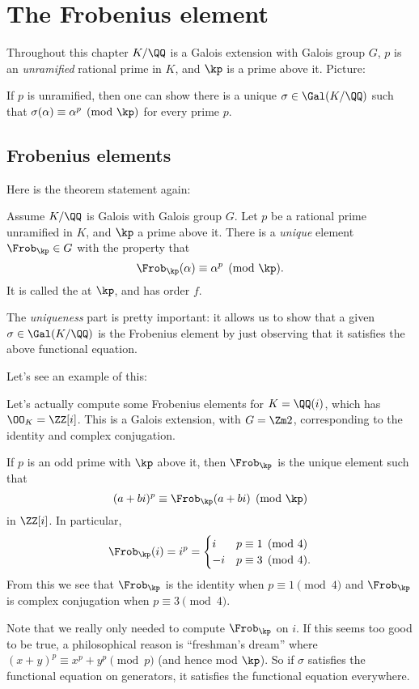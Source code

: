 \chapter{The Frobenius element}
Throughout this chapter $K/\QQ$ is a Galois extension with Galois group $G$,
$p$ is an \emph{unramified} rational prime in $K$, and $\kp$ is a prime above it.
Picture:
\begin{center}
\end{center}
If $p$ is unramified, then one can show there
is a unique $\sigma \in \Gal(K/\QQ)$ such that
$\sigma(\alpha) \equiv \alpha^p \pmod{\kp}$ for every prime $p$.

\section{Frobenius elements}

Here is the theorem statement again:
\begin{theorem}
	Assume $K/\QQ$ is Galois with Galois group $G$.
	Let $p$ be a rational prime unramified in $K$, and $\kp$ a prime above it.
	There is a \emph{unique} element $\Frob_\kp \in G$
	with the property that
	\[ \Frob_\kp(\alpha) \equiv \alpha^{p} \pmod{\kp}. \]
	It is called the  at $\kp$, and has order $f$.
\end{theorem}
The \emph{uniqueness} part is pretty important:
it allows us to show that a given $\sigma \in \Gal(K/\QQ)$
is the Frobenius element by just observing that it satisfies
the above functional equation.

Let's see an example of this:
\begin{example}
	Let's actually compute some Frobenius elements for $K = \QQ(i)$,
	which has $\OO_K = \ZZ[i]$.
	This is a Galois extension, with $G = \Zm2$,
	corresponding to the identity and complex conjugation.

	If $p$ is an odd prime with $\kp$ above it,
	then $\Frob_\kp$ is the unique element such that
	\[ (a+bi)^p \equiv \Frob_\kp(a+bi) \pmod{\kp} \]
	in $\ZZ[i]$. In particular,
	\[ \Frob_\kp(i) = i^p =
		\begin{cases}
			i & p \equiv 1 \pmod 4 \\
			-i & p \equiv 3 \pmod 4.
		\end{cases}
	\]
	From this we see that $\Frob_\kp$ is the identity when $p \equiv 1 \pmod 4$
	and $\Frob_\kp$ is complex conjugation when $p \equiv 3 \pmod 4$.
\end{example}
Note that we really only needed to compute $\Frob_\kp$ on $i$.
If this seems too good to be true,
a philosophical reason is ``freshman's dream''
where $(x+y)^p \equiv x^p + y^p \pmod{p}$ (and hence mod $\kp$).
So if $\sigma$ satisfies the functional equation on generators,
it satisfies the functional equation everywhere.


